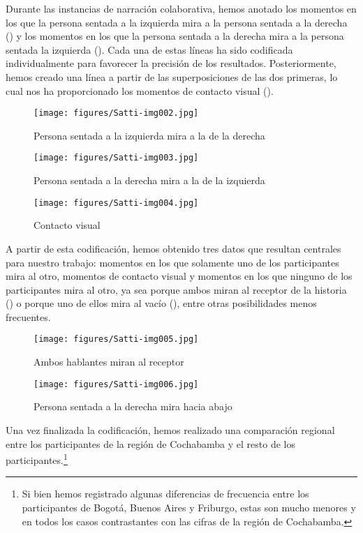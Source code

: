 \documentclass[output=paper]{../langscibook}
\begin{document}
Durante las instancias de narración colaborativa, hemos anotado los momentos en los que la persona sentada a la izquierda mira a la persona sentada a la derecha () y los momentos en los que la persona sentada a la derecha mira a la persona sentada la izquierda (). Cada una de estas líneas ha sido codificada individualmente para favorecer la precisión de los resultados. Posteriormente, hemos creado una línea a partir de las superposiciones de las dos primeras, lo cual nos ha proporcionado los momentos de contacto visual ().

\begin{figure}
\texttt{[image: figures/Satti-img002.jpg]}
\caption{\label{fig:satti:2}  Persona sentada a la izquierda mira a la de la derecha}
\end{figure}

\begin{figure}
\texttt{[image: figures/Satti-img003.jpg]}
\caption{\label{fig:satti:3} Persona sentada a la derecha mira a la de la izquierda}
\end{figure}

\begin{figure}
\texttt{[image: figures/Satti-img004.jpg]}
\caption{\label{fig:satti:4}Contacto visual}
\end{figure}

A partir de esta codificación, hemos obtenido tres datos que resultan centrales para nuestro trabajo: momentos en los que solamente uno de los participantes mira al otro, momentos de contacto visual y momentos en los que ninguno de los participantes mira al otro, ya sea porque ambos miran al receptor de la historia () o porque uno de ellos mira al vacío (), entre otras posibilidades menos frecuentes.

\begin{figure}
\texttt{[image: figures/Satti-img005.jpg]}
\caption{\label{fig:satti:5} Ambos hablantes miran al receptor}
\end{figure}

\begin{figure}
\texttt{[image: figures/Satti-img006.jpg]}
\caption{\label{fig:satti:6} Persona sentada a la derecha mira hacia abajo}
\end{figure}

Una vez finalizada la codificación, hemos realizado una comparación regional entre los participantes de la región de Cochabamba y el resto de los participantes.\footnote{Si bien hemos registrado algunas diferencias de frecuencia entre los participantes de Bogotá, Buenos Aires y Friburgo, estas son mucho menores y en todos los casos contrastantes con las cifras de la región de Cochabamba.}  
\end{document}
